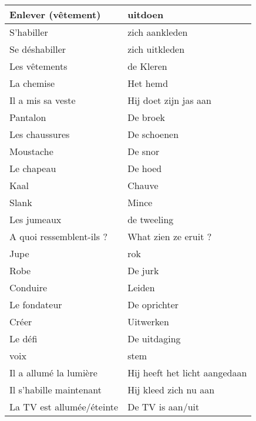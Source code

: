 \documentclass[a4paper]{article}
\begin{document}
\begin{center}
\begin{tabular}{|l|l|}
    \hline
    Enlever (vêtement) & uitdoen\\
    \hline
    S'habiller & zich aankleden \\
    \hline
    Se déshabiller & zich uitkleden\\
    \hline
    Les vêtements & de Kleren\\
    \hline
    La chemise & Het hemd\\
    \hline
    Il a mis sa veste & Hij doet zijn jas aan\\
    \hline
    Pantalon & De broek\\
    \hline
    Les chaussures & De schoenen\\
    \hline
    Moustache & De snor \\
    \hline
    Le chapeau & De hoed\\
    \hline
    Kaal & Chauve\\
    \hline
    Slank & Mince\\
    \hline
    Les jumeaux & de tweeling\\
    \hline
    A quoi ressemblent-ils ? & What zien ze eruit ?\\
    \hline
    Jupe & rok\\
    \hline
    Robe & De jurk\\
    \hline
    Conduire & Leiden\\
    \hline
    Le fondateur & De oprichter \\
    \hline
    Créer & Uitwerken\\
    \hline
    Le défi & De uitdaging\\
    \hline
    voix & stem\\
    \hline
    Il a allumé la lumière & Hij heeft het licht aangedaan\\
    \hline
    Il s'habille maintenant & Hij kleed zich nu aan\\
    \hline
    La TV est allumée/éteinte & De TV is aan/uit\\
    \hline
  \end{tabular}
\end{center}
\end{document}
